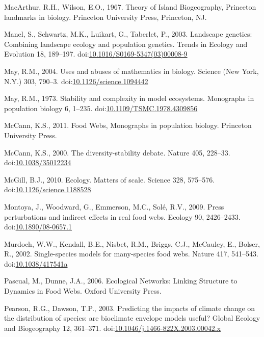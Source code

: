\hypertarget{ref-MacArthur1967}{}
MacArthur, R.H., Wilson, E.O., 1967. Theory of Island Biogeography,
Princeton landmarks in biology. Princeton University Press, Princeton,
NJ.

\hypertarget{ref-Manel2003}{}
Manel, S., Schwartz, M.K., Luikart, G., Taberlet, P., 2003. Landscape
genetics: Combining landscape ecology and population genetics. Trends in
Ecology and Evolution 18, 189--197.
doi:\href{https://doi.org/10.1016/S0169-5347(03)00008-9}{10.1016/S0169-5347(03)00008-9}

\hypertarget{ref-May2004}{}
May, R.M., 2004. Uses and abuses of mathematics in biology. Science (New
York, N.Y.) 303, 790--3.
doi:\href{https://doi.org/10.1126/science.1094442}{10.1126/science.1094442}

\hypertarget{ref-May1973}{}
May, R.M., 1973. Stability and complexity in model ecosystems.
Monographs in population biology 6, 1--235.
doi:\href{https://doi.org/10.1109/TSMC.1978.4309856}{10.1109/TSMC.1978.4309856}

\hypertarget{ref-mccann2011food}{}
McCann, K.S., 2011. Food Webs, Monographs in population biology.
Princeton University Press.

\hypertarget{ref-McCann2000}{}
McCann, K.S., 2000. The diversity-stability debate. Nature 405, 228--33.
doi:\href{https://doi.org/10.1038/35012234}{10.1038/35012234}

\hypertarget{ref-McGill2010}{}
McGill, B.J., 2010. Ecology. Matters of scale. Science 328, 575--576.
doi:\href{https://doi.org/10.1126/science.1188528}{10.1126/science.1188528}

\hypertarget{ref-Montoya2009}{}
Montoya, J., Woodward, G., Emmerson, M.C., Solé, R.V., 2009. Press
perturbations and indirect effects in real food webs. Ecology 90,
2426--2433.
doi:\href{https://doi.org/10.1890/08-0657.1}{10.1890/08-0657.1}

\hypertarget{ref-Murdoch2002}{}
Murdoch, W.W., Kendall, B.E., Nisbet, R.M., Briggs, C.J., McCauley, E.,
Bolser, R., 2002. Single-species models for many-species food webs.
Nature 417, 541--543.
doi:\href{https://doi.org/10.1038/417541a}{10.1038/417541a}

\hypertarget{ref-Pascual2006}{}
Pascual, M., Dunne, J.A., 2006. Ecological Networks: Linking Structure
to Dynamics in Food Webs. Oxford University Press.

\hypertarget{ref-Pearson2003}{}
Pearson, R.G., Dawson, T.P., 2003. Predicting the impacts of climate
change on the distribution of species: are bioclimate envelope models
useful? Global Ecology and Biogeography 12, 361--371.
doi:\href{https://doi.org/10.1046/j.1466-822X.2003.00042.x}{10.1046/j.1466-822X.2003.00042.x}

